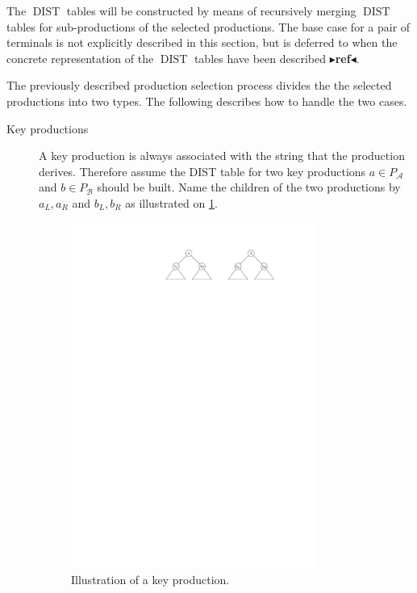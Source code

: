 \documentclass[twoside,11pt,openright]{report}
\newcommand{\todo}[1]{{\color[rgb]{.5,0,0}\textbf{$\blacktriangleright$#1$\blacktriangleleft$}}}
\newcommand{\DIST}{\operatorname{DIST}}
\begin{document}
The $\DIST$ tables will be constructed by means of recursively merging $\DIST$ tables for sub-productions of the selected productions. The base case for a pair of terminals is not explicitly described in this section, but is deferred to when the concrete representation of the $\DIST$ tables have been described \todo{ref}.

The previously described production selection process divides the the selected productions into two types. The following describes how to handle the two cases.
\begin{description}
  \item[Key productions] A key production is always associated with the string that the production derives. Therefore assume the DIST table for two key productions $a \in P_{\mathcal{A}}$ and $b \in P_{\mathcal{B}}$ should be built. Name the children of the two productions by $a_L, a_R$ and $b_L, b_R$ as illustrated on \cref{fig:distrepo-key}.
  
  \begin{figure}[h!]
    \centering
    \includegraphics[width=8cm]{images/distrepo-key}
    \caption{Illustration of a key production.}
    \label{fig:distrepo-key}
  \end{figure}
  

\end{description}
\end{document}
